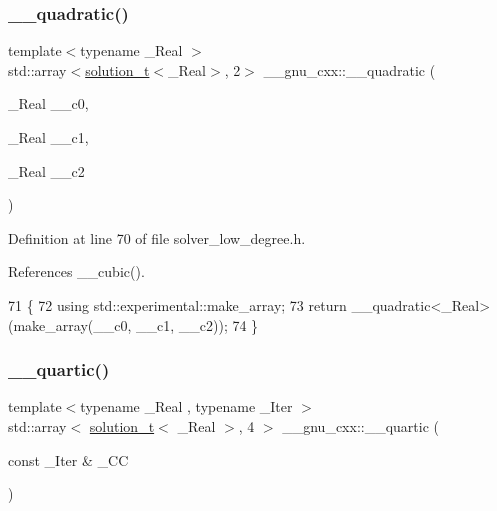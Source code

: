 \subsubsection{\texorpdfstring{\+\_\+\+\_\+quadratic()}{\_\_quadratic()}\hspace{0.1cm}{\footnotesize\ttfamily [2/2]}}
{\footnotesize\ttfamily template$<$typename \+\_\+\+Real $>$ \\
std\+::array$<$\hyperlink{namespace____gnu__cxx_ae20ea642de50eb361074c62676b0159c}{solution\+\_\+t}$<$\+\_\+\+Real$>$, 2$>$ \+\_\+\+\_\+gnu\+\_\+cxx\+::\+\_\+\+\_\+quadratic (\begin{DoxyParamCaption}\item[{\+\_\+\+Real}]{\+\_\+\+\_\+c0,  }\item[{\+\_\+\+Real}]{\+\_\+\+\_\+c1,  }\item[{\+\_\+\+Real}]{\+\_\+\+\_\+c2 }\end{DoxyParamCaption})\hspace{0.3cm}{\ttfamily [inline]}}



Definition at line 70 of file solver\+\_\+low\+\_\+degree.\+h.



References \+\_\+\+\_\+cubic().


\begin{DoxyCode}
71     \{
72       \textcolor{keyword}{using} std::experimental::make\_array;
73       \textcolor{keywordflow}{return} \_\_quadratic<\_Real>(make\_array(\_\_c0, \_\_c1, \_\_c2));
74     \}
\end{DoxyCode}
\mbox{\label{namespace____gnu__cxx_ac813fbad739bf1d431845d5175f24701}} 
\subsubsection{\texorpdfstring{\+\_\+\+\_\+quartic()}{\_\_quartic()}\hspace{0.1cm}{\footnotesize\ttfamily [1/2]}}
{\footnotesize\ttfamily template$<$typename \+\_\+\+Real , typename \+\_\+\+Iter $>$ \\
std\+::array$<$ \hyperlink{namespace____gnu__cxx_ae20ea642de50eb361074c62676b0159c}{solution\+\_\+t}$<$ \+\_\+\+Real $>$, 4 $>$ \+\_\+\+\_\+gnu\+\_\+cxx\+::\+\_\+\+\_\+quartic (\begin{DoxyParamCaption}\item[{const \+\_\+\+Iter \&}]{\+\_\+\+CC }\end{DoxyParamCaption})}



